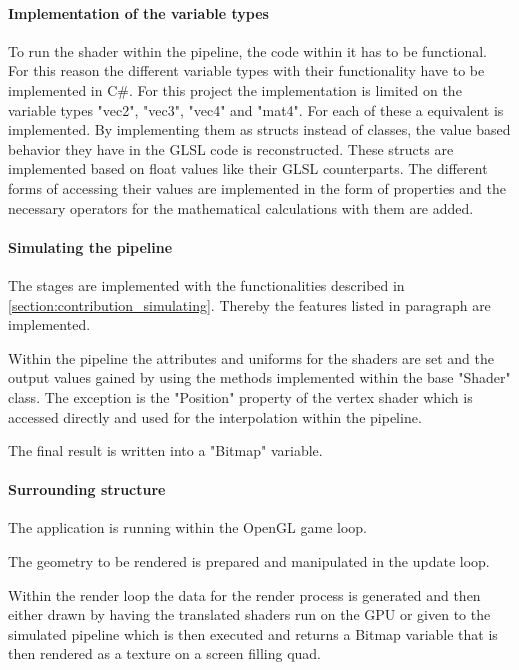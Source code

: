 \paragraph{Implementation of the variable types}
\label{paragraph:variableTypes}

To run the shader within the pipeline, the code within it has to be functional. For this reason the different variable types with their functionality have to be implemented in C\#. For this project the implementation is limited on the variable types "vec2", "vec3", "vec4" and "mat4". For each of these a equivalent is implemented. By implementing them as structs instead of classes, the value based behavior they have in the GLSL code is reconstructed. These structs are implemented based on float values like their GLSL counterparts. The different forms of accessing their values are implemented in the form of properties and the necessary operators for the mathematical calculations with them are added.

\paragraph{Simulating the pipeline}

The stages are implemented with the functionalities described in \autoref{section:contribution_simulating}. Thereby the features listed in paragraph  are implemented.

Within the pipeline the attributes and uniforms for the shaders are set and the output values gained by using the methods implemented within the base "Shader" class. The exception is the "Position" property of the vertex shader which is accessed directly and used for the interpolation within the pipeline.

The final result is written into a "Bitmap" variable.

\paragraph{Surrounding structure}

The application is running within the OpenGL game loop.

The geometry to be rendered is prepared and manipulated in the update loop.

Within the render loop the data for the render process is generated and then either drawn by having the translated shaders run on the GPU or given to the simulated pipeline which is then executed and returns a Bitmap variable that is then rendered as a texture on a screen filling quad.

